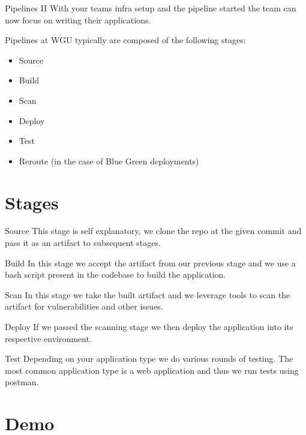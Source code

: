 \documentclass{beamer}
\begin{document}
    \begin{frame}{Pipelines II}
      With your teams infra setup and the pipeline started the team can now
      focus on writing their applications.

      Pipelines at WGU typically are composed of the following stages:
      \begin{itemize}
        \item Source
        \item Build
        \item Scan
        \item Deploy
        \item Test
        \item Reroute (in the case of Blue Green deployments)
      \end{itemize}
    \end{frame}

  \section{Stages}
    \begin{frame}{Source}
      This stage is self explanatory, we clone the repo at the 
      given commit and pass it as an artifact to subsequent stages.
    \end{frame}

    \begin{frame}{Build}
      In this stage we accept the artifact from our previous stage
      and we use a bash script present in the codebase to build the
      application.
    \end{frame}

    \begin{frame}{Scan}
      In this stage we take the built artifact and we leverage tools
      to scan the artifact for vulnerabilities and other issues.
    \end{frame}

    \begin{frame}{Deploy}
      If we passed the scanning stage we then deploy the application
      into its respective environment.
    \end{frame}

    \begin{frame}{Test}
      Depending on your application type we do various rounds of testing.
      The most common application type is a web application and thus we
      run tests using postman.
    \end{frame}

  \section{Demo}
    \begin{frame}{}

    \end{frame}
\end{document}

